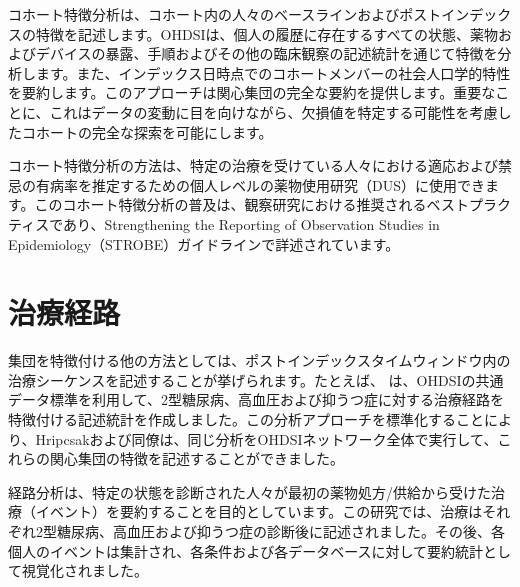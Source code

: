 \documentclass[
  11pt]{book}
\theoremstyle{definition}
\theoremstyle{definition}
\theoremstyle{definition}
\theoremstyle{definition}
\theoremstyle{remark}
\begin{document}
コホート特徴分析は、コホート内の人々のベースラインおよびポストインデックスの特徴を記述します。OHDSIは、個人の履歴に存在するすべての状態、薬物およびデバイスの暴露、手順およびその他の臨床観察の記述統計を通じて特徴を分析します。また、インデックス日時点でのコホートメンバーの社会人口学的特性を要約します。このアプローチは関心集団の完全な要約を提供します。重要なことに、これはデータの変動に目を向けながら、欠損値を特定する可能性を考慮したコホートの完全な探索を可能にします。

コホート特徴分析の方法は、特定の治療を受けている人々における適応および禁忌の有病率を推定するための個人レベルの薬物使用研究（DUS）に使用できます。このコホート特徴分析の普及は、観察研究における推奨されるベストプラクティスであり、Strengthening the Reporting of Observation Studies in Epidemiology（STROBE）ガイドラインで詳述されています。\citep{VONELM2008344}   

\section{治療経路}\label{ux6cbbux7642ux7d4cux8def}

集団を特徴付ける他の方法としては、ポストインデックスタイムウィンドウ内の治療シーケンスを記述することが挙げられます。たとえば、\citet{Hripcsak7329} は、OHDSIの共通データ標準を利用して、2型糖尿病、高血圧および抑うつ症に対する治療経路を特徴付ける記述統計を作成しました。この分析アプローチを標準化することにより、Hripcsakおよび同僚は、同じ分析をOHDSIネットワーク全体で実行して、これらの関心集団の特徴を記述することができました。   

経路分析は、特定の状態を診断された人々が最初の薬物処方/供給から受けた治療（イベント）を要約することを目的としています。この研究では、治療はそれぞれ2型糖尿病、高血圧および抑うつ症の診断後に記述されました。その後、各個人のイベントは集計され、各条件および各データベースに対して要約統計として視覚化されました。
\end{document}
